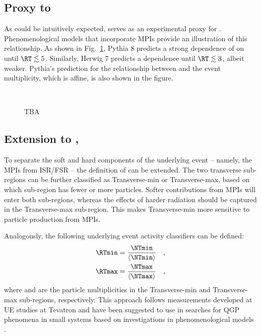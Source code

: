 \subsection{Proxy to \nmpi}

As could be intuitively expected, \RT serves as an experimental proxy for \meannmpi. Phenomenological models that incorporate MPIs provide an illustration of this relationship. As shown in Fig.~\ref{fig:rt:nmpi}, Pythia 8 predicts a strong dependence of \meannmpi on \RT until $\RT \lesssim 5$. Similarly, Herwig 7 predicts a dependence until $\RT \lesssim 3$, albeit weaker. Pythia's prediction for the relationship between \RT and the event multiplicity, which is affine, is also shown in the figure.

\begin{figure}%
\\
\caption{TBA}
\label{fig:rt:nmpi}
\end{figure}


\subsection{Extension to \RTmin, \RTmax}

To separate the soft and hard components of the underlying event -- namely, the MPIs from ISR/FSR -- the definition of \RT can be extended. The two transverse sub-regions can be further classified as Transverse-min or Transverse-max, based on which sub-region has fewer or more particles. Softer contributions from MPIs will enter both sub-regions, whereas the effects of harder radiation should be captured in the Transverse-max sub-region. This makes Transverse-min more sensitive to particle production from MPIs.

Analogously, the following underlying event activity classifiers can be defined:
\begin{align}
\RTmin &= \frac{\NTmin}{\langle \NTmin \rangle} \quad, \\
\RTmax &= \frac{\NTmax}{\langle \NTmax \rangle} \quad,
\end{align}
where \NTmin and \NTmax are the particle multiplicities in the Transverse-min and Transverse-max sub-regions, respectively. This approach follows measurements developed at UE studies at Tevatron and have been suggested to use in searches for QGP phenomena in small systems based on investigations in phenomenological models \cite{antonio-rtmin}.

